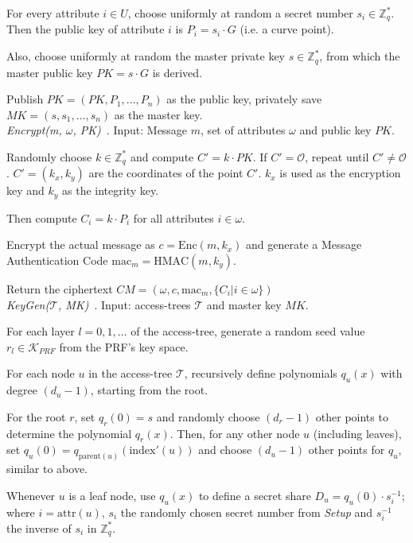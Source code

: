 For every attribute $i \in U$, choose uniformly at random a secret number $s_i \in \mathbb{Z}_q^*$.
Then the public key of attribute $i$ is $P_i = s_i \cdot G$ (i.e. a curve point).

Also, choose uniformly at random the master private key $s \in \mathbb{Z}_q^*$, from which the master public key $PK = s \cdot G$ is derived.

Publish $PK=(PK, P_1, \dots, P_n)$ as the public key, privately save $MK = (s, s_1, \dots, s_n)$ as the master key.
\\

\noindent \emph{Encrypt(m, $\omega$, PK)}~\cite{yao_lightweight_2015}.
Input: Message $m$, set of attributes $\omega$ and public key $PK$.

Randomly choose $k \in \mathbb{Z}_q^*$ and compute $C' = k \cdot PK$. If $C' = \mathcal{O}$, repeat until $C' \neq \mathcal{O}$.
$C' = (k_x, k_y)$ are the coordinates of the point $C'$. $k_x$ is used as the encryption key and $k_y$ as the integrity key.

Then compute $C_i = k \cdot P_i$ for all attributes $i \in \omega$.

Encrypt the actual message as $c = \text{Enc}(m, k_x)$ and generate a Message Authentication Code $\text{mac}_m = \text{HMAC}(m, k_y)$.

Return the ciphertext $CM = (\omega, c, \text{mac}_m, \{C_i | i \in \omega\})$\\

\noindent \emph{KeyGen($\mathcal{T}$, MK)}~\cite{yao_lightweight_2015,tan_enhancement_2019}.
Input: \glspl{access-tree} $\mathcal{T}$ and master key $MK$.

For each layer $l = 0, 1, \dots$ of the \gls{access-tree}, generate a random seed value $r_l \in \mathcal{K}_{PRF}$ from the PRF's key space.

For each node $u$ in the \gls{access-tree} $\mathcal{T}$, recursively define polynomials $q_u(x)$ with degree $(d_u - 1)$, starting from the root.

For the root $r$, set $q_r(0) = s$ and randomly choose $(d_r - 1)$ other points to determine the polynomial $q_r(x)$.
Then, for any other node $u$ (including leaves), set $q_u(0) = q_{\text{parent}(u)}(\text{index}'(u))$ and choose $(d_u -1)$ other points for $q_u$, similar to above.

Whenever $u$ is a leaf node, use $q_u(x)$ to define a secret share $D_u = q_u(0) \cdot s_i^{-1}$; where $i = \text{attr}(u)$, $s_i$ the randomly chosen secret number from \emph{Setup} and $s_i^{-1}$ the inverse of $s_i$ in $\mathbb{Z}_q^*$.

